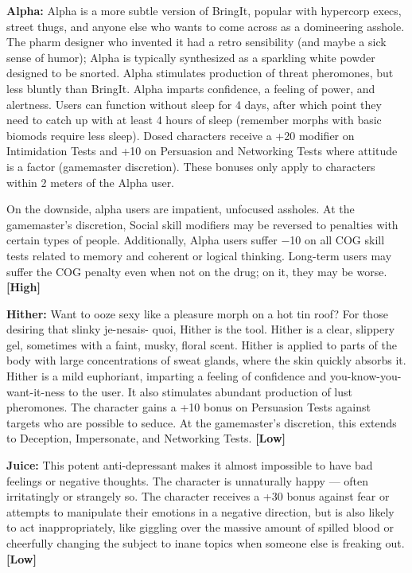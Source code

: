 \textbf{Alpha:} Alpha is a more subtle version of BringIt, popular with hypercorp execs, street thugs, and anyone else who wants to come across as a domineering asshole. The pharm designer who invented it had a retro sensibility (and maybe a sick sense of humor); Alpha is typically synthesized as a sparkling white powder designed to be snorted. Alpha stimulates production of threat pheromones, but less bluntly than BringIt. Alpha imparts confidence, a feeling of power, and alertness. Users can function without sleep for 4 days, after which point they need to catch up with at least 4 hours of sleep (remember morphs with basic biomods require less sleep). Dosed characters receive a +20 modifier on Intimidation Tests and +10 on Persuasion and Networking Tests where attitude is a factor (gamemaster discretion). These bonuses only apply to characters within 2 meters of the Alpha user.

On the downside, alpha users are impatient, unfocused assholes. At the gamemaster’s discretion, Social skill modifiers may be reversed to penalties with certain types of people. Additionally, Alpha users suffer $-$10 on all COG skill tests related to memory and coherent or logical thinking. Long-term users may suffer the COG penalty even when not on the drug; on it, they may be worse. \textbf{[High]}

\textbf{Hither:} Want to ooze sexy like a pleasure morph on a hot tin roof? For those desiring that slinky je-nesais- quoi, Hither is the tool. Hither is a clear, slippery gel, sometimes with a faint, musky, floral scent. Hither is applied to parts of the body with large concentrations of sweat glands, where the skin quickly absorbs it. Hither is a mild euphoriant, imparting a feeling of confidence and you-know-you-want-it-ness to the user. It also stimulates abundant production of lust pheromones. The character gains a +10 bonus on Persuasion Tests against targets who are possible to seduce. At the gamemaster’s discretion, this extends to Deception, Impersonate, and Networking Tests. \textbf{[Low]}

\textbf{Juice:} This potent anti-depressant makes it almost impossible to have bad feelings or negative thoughts. The character is unnaturally happy --- often irritatingly or strangely so. The character receives a +30 bonus against fear or attempts to manipulate their emotions in a negative direction, but is also likely to act inappropriately, like giggling over the massive amount of spilled blood or cheerfully changing the subject to inane topics when someone else is freaking out. \textbf{[Low]}


